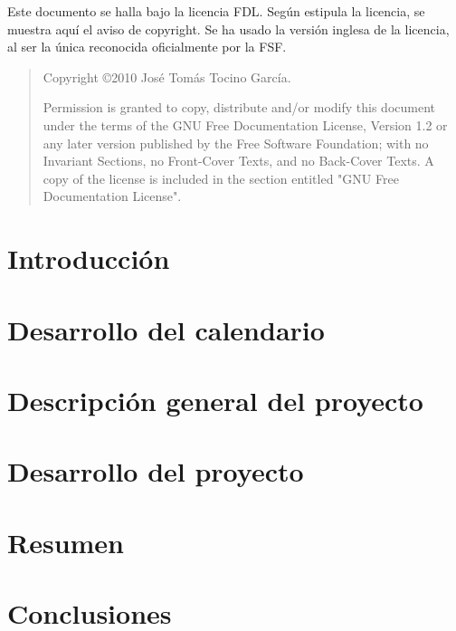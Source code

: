 \documentclass[a4paper,12pt,titlepage,halfparskip,cleardoubleempty]{scrbook}
\begin{document}
Este documento se halla bajo la licencia \ac{FDL}. Según estipula la
licencia, se muestra aquí el aviso de copyright. Se ha usado la
versión inglesa de la licencia, al ser la única reconocida
oficialmente por la \ac{FSF}.

\begin{quote}
  Copyright \copyright  2010 José Tomás Tocino García.
  
  Permission is granted to copy, distribute and/or modify this document
  under the terms of the GNU Free Documentation License, Version 1.2
  or any later version published by the Free Software Foundation;
  with no Invariant Sections, no Front-Cover Texts, and no Back-Cover Texts.
  A copy of the license is included in the section entitled "GNU
  Free Documentation License".
\end{quote}

\clearpage


\tableofcontents
\listoffigures
\listoftables

\chapter{Introducción}


\chapter{Desarrollo del calendario}

 
\chapter{Descripción general del proyecto}

 
\chapter{Desarrollo del proyecto}


\chapter{Resumen}
%
 
\chapter{Conclusiones}
%
\end{document}
